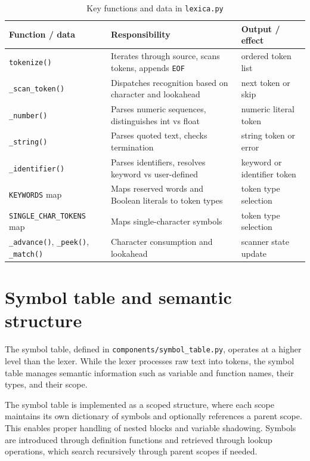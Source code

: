 \begin{table}[H]
\centering
\caption{Key functions and data in \texttt{lexica.py}}
\label{tab:lexica-functions}
\small
\begin{tabular}{@{}>{\raggedright\arraybackslash}p{}>{\raggedright\arraybackslash}p{}>{\raggedright\arraybackslash}p{}@{}}
\toprule
Function / data & Responsibility & Output / effect \\
\midrule
\texttt{tokenize()} & Iterates through source, scans tokens, appends
\texttt{EOF} & ordered token list \\
\texttt{\_scan\_token()} & Dispatches recognition based on character and
lookahead & next token or skip \\
\texttt{\_number()} & Parses numeric sequences, distinguishes int vs float &
numeric literal token \\
\texttt{\_string()} & Parses quoted text, checks termination & string token or
error \\
\texttt{\_identifier()} & Parses identifiers, resolves keyword vs user-defined
& keyword or identifier token \\
\texttt{KEYWORDS} map & Maps reserved words and Boolean literals to token types & token type
selection \\
\texttt{SINGLE\_CHAR\_TOKENS} map & Maps single-character symbols & token type
selection \\
\texttt{\_advance()}, \texttt{\_peek()}, \texttt{\_match()} & Character
consumption and lookahead & scanner state update \\
\bottomrule
\end{tabular}
\end{table}

\section{Symbol table and semantic structure}
The symbol table, defined in \texttt{components/symbol\_table.py}, operates at a
higher level than the lexer. While the lexer processes raw text into tokens, the
symbol table manages semantic information such as variable and function names,
their types, and their scope.

The symbol table is implemented as a scoped structure, where each scope
maintains its own dictionary of symbols and optionally references a parent
scope. This enables proper handling of nested blocks and variable shadowing.
Symbols are introduced through definition functions and retrieved through
lookup operations, which search recursively through parent scopes if needed.


